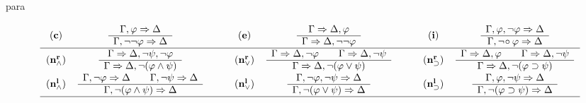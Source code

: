 \begin{entry}{para}

\newcommand{\G}{{\bf G}}
\newcommand{\GBK}{{\G_{\bf BK}}}
\newcommand{\name}[1]{{\bf (#1)}}
\newcommand{\vfi}{\varphi}
\newcommand{\su}{\supset}
\newcommand{\ssrul}[2]{\begin{array}{c}#1\\ \hline #2\end{array}}
\newcommand{\ddrul}[3]{\begin{array}{c}#1\hspace{2em}#2\\
\hline #3\end{array}}
\newcommand{\Ga}{\Gamma}
\newcommand{\De}{\Delta}
\newcommand{\Ra}{\Rightarrow}
\newcommand{\srul}[4]{\ssrul{\Ga #1\Ra\De #2}{\Ga
#3\Ra\De #4}}
\newcommand{\drul}[6]{\ddrul{\Ga #1\Ra\De #2}{\Ga #3\Ra\De #4}{\Ga
#5\Ra\De #6}}
\newcommand{\w}{\wedge}

\begin{calculus}

\renewcommand*{\arraystretch}{1.5}
\footnotesize
\[\begin{tabular}{ccc@{\hspace{2em}}ccc@{\hspace{2em}}cc}%
%
${\name{c}}$ &     $\srul{,\vfi}{}{,\neg\neg\vfi}{}$  &&
${\name{e}}$    & $\srul{}{,\vfi}{}{,\neg\neg\vfi}$  &&
${\name{i}}$ &    $\srul{,\vfi,\neg\vfi}{}{,\neg\! \circ \vfi}{}$ \\\hline
${\name{n^r_\w}}$ &
$\srul{}{,\neg\psi,\neg\vfi}{}{,\neg (\vfi\w\psi)}$ &&
${\name{n^r_\vee}}$ &       $\drul{}{,\neg\vfi}{}{,\neg\psi}{}{,\neg(\vfi\vee\psi)}$
&&
${\name{n^r_\su}}$ &   $\drul{}{,\vfi}{}{,\neg\psi}{}{,\neg(\vfi\su\psi)}$
 \\

${\name{n^l_\w}}$ &   $\drul{,\neg \vfi}{}{,\neg \psi}{}{,\neg(\vfi\w\psi)}{}$ &&
${\name{n^l_\vee}}$ & $\srul{,\neg\vfi,\neg\psi}{}{,\neg(\vfi\vee\psi)}{}$ &&
${\name{n^l_\su}}$  &  $\srul{,\vfi,\neg\psi}{}{,\neg(\vfi\su \psi)}{}$  \\\hline


\end{tabular}\]
\end{calculus}
\end{entry}
